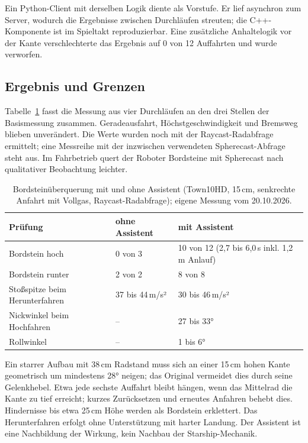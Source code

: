 Ein Python-Client mit derselben Logik diente als Vorstufe. Er lief asynchron zum Server,
wodurch die Ergebnisse zwischen Durchläufen streuten; die C++-Komponente ist im
Spieltakt reproduzierbar. Eine zusätzliche Anhaltelogik vor der Kante verschlechterte das
Ergebnis auf 0 von 12 Auffahrten und wurde verworfen.

\subsection{Ergebnis und Grenzen}
\label{sec:starship_bordstein_ergebnis}

Tabelle~\ref{tab:starship_bordstein} fasst die Messung aus vier Durchläufen an den drei
Stellen der Basismessung zusammen. Geradeausfahrt, Höchstgeschwindigkeit und
Bremsweg blieben unverändert. Die Werte wurden noch mit der Raycast-Radabfrage
ermittelt; eine Messreihe mit der inzwischen verwendeten Spherecast-Abfrage steht aus.
Im Fahrbetrieb quert der Roboter Bordsteine mit Spherecast nach qualitativer
Beobachtung leichter.

\begin{table}[htbp]
  \centering
  \caption{Bordsteinüberquerung mit und ohne Assistent (Town10HD, 15\,cm, senkrechte
  Anfahrt mit Vollgas, Raycast-Radabfrage); eigene Messung vom 20.10.2026.}
  \label{tab:starship_bordstein}
  \begin{tabular}{lll}
    \hline
    Prüfung & ohne Assistent & mit Assistent \\
    \hline
    Bordstein hoch & 0 von 3 & 10 von 12 (2,7 bis 6,0\,s inkl. 1,2\,m Anlauf) \\
    Bordstein runter & 2 von 2 & 8 von 8 \\
    Stoßspitze beim Herunterfahren & 37 bis 44\,m/s² & 30 bis 46\,m/s² \\
    Nickwinkel beim Hochfahren & -- & 27 bis 33° \\
    Rollwinkel & -- & 1 bis 6° \\
    \hline
  \end{tabular}
\end{table}

Ein starrer Aufbau mit 38\,cm Radstand muss sich an einer 15\,cm hohen Kante
geometrisch um mindestens 28° neigen; das Original vermeidet dies durch seine
Gelenkhebel. Etwa jede sechste Auffahrt bleibt hängen, wenn das Mittelrad die Kante zu
tief erreicht; kurzes Zurücksetzen und erneutes Anfahren behebt dies. Hindernisse bis
etwa 25\,cm Höhe werden als Bordstein erklettert. Das Herunterfahren erfolgt ohne
Unterstützung mit harter Landung. Der Assistent ist eine Nachbildung der Wirkung, kein
Nachbau der Starship-Mechanik.
